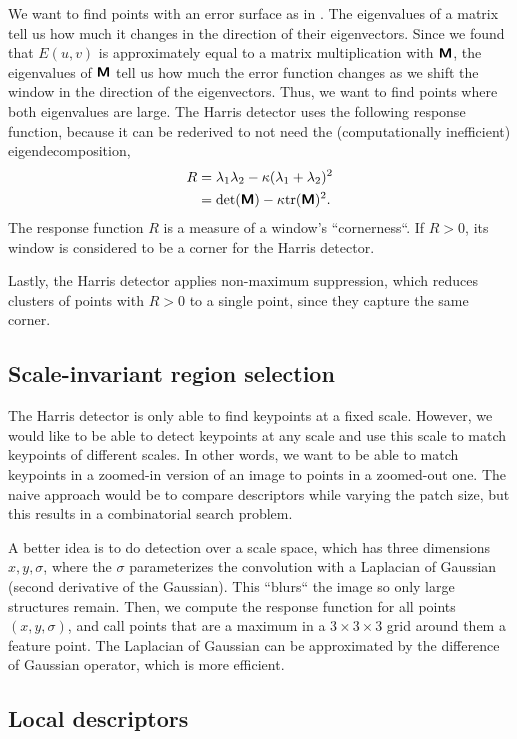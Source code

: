 We want to find points with an error surface as in
. The eigenvalues of a matrix tell us how much
it changes in the direction of their eigenvectors. Since we found that $E(u,v)$
is approximately equal to a matrix multiplication with $\bm{\mathsf{M}}$, the
eigenvalues of $\bm{\mathsf{M}}$ tell us how much the error function changes as we
shift the window in the direction of the eigenvectors. Thus, we want to find
points where both eigenvalues are large. The Harris detector uses the following
response function, because it can be rederived to not need the (computationally
inefficient) eigendecomposition,
\begin{align*}
  R &= \lambda_1\lambda_2 - \kappa (\lambda_1+\lambda_2)^2 \\
  &= \det{\tens{M}}-\kappa \tr{\tens{M}}^2
.\end{align*}
The response function $R$ is a measure of a window's ``cornerness``. If
$R>0$, its window is considered to be a corner for the Harris detector.

Lastly, the Harris detector applies non-maximum suppression, which reduces
clusters of points with $R>0$ to a single point, since they capture the same
corner.

\subsection{Scale-invariant region selection}

The Harris detector is only able to find keypoints at a fixed scale. However,
we would like to be able to detect keypoints at any scale and use this scale to
match keypoints of different scales. In other words, we want to be able to
match keypoints in a zoomed-in version of an image to points in a zoomed-out
one. The naive approach would be to compare descriptors while varying the patch
size, but this results in a combinatorial search problem.

A better idea is to do detection over a scale space, which has three dimensions
$x,y,\sigma$, where the $\sigma$ parameterizes the convolution with a Laplacian
of Gaussian (second derivative of the Gaussian). This ``blurs`` the image so only
large structures remain. Then, we compute the response function for all points
$(x,y,\sigma)$, and call points that are a maximum in a $3\times 3\times 3$
grid around them a feature point. The Laplacian of Gaussian can be approximated
by the difference of Gaussian operator, which is more efficient.

\subsection{Local descriptors}

